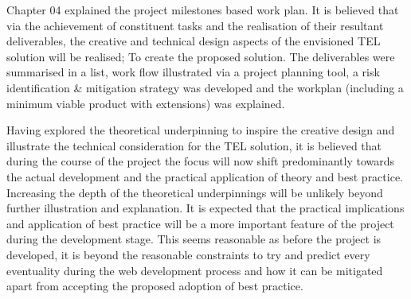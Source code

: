 Chapter 04 explained the project milestones based work plan. It is believed that via the achievement of constituent tasks and the realisation of their resultant deliverables, the creative and technical design aspects of the envisioned TEL solution will be realised; To create the proposed solution. The deliverables were summarised in a list, work flow illustrated via a project planning tool, a risk identification \& mitigation strategy was developed and the workplan (including a minimum viable product with extensions) was explained.

Having explored the theoretical underpinning to inspire the creative design and illustrate the technical consideration for the TEL solution, it is believed that during the course of the project the focus will now shift predominantly towards the actual development and the practical application of theory and best practice. Increasing the depth of the theoretical underpinnings will be unlikely beyond further illustration and explanation. It is expected that the practical implications and application of best practice will be a more important feature of the project during the development stage. This seems reasonable as before the project is developed, it is beyond the reasonable constraints to try and predict every eventuality during the web development process and how it can be mitigated apart from accepting the proposed adoption of  best practice.